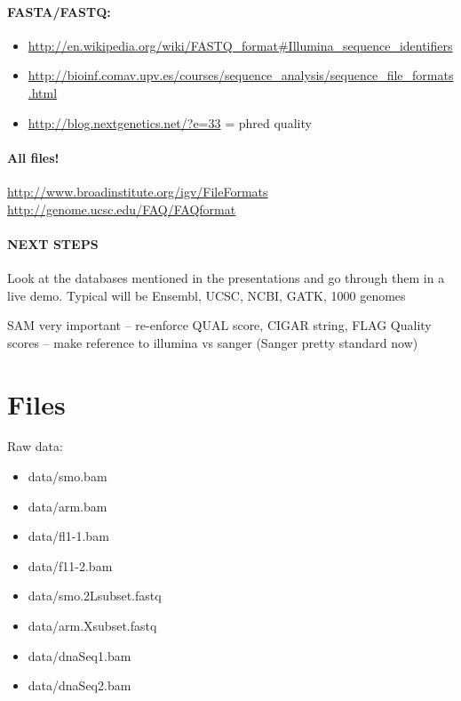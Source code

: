 \documentclass[letterpaper,10pt,english]{sphinxmanual}
\begin{document}
\subsubsection{FASTA/FASTQ:}
\label{known_file_formats:fasta-fastq}\begin{itemize}
\item {} 
\href{http://en.wikipedia.org/wiki/FASTQ\_format\#Illumina\_sequence\_identifiers}{http://en.wikipedia.org/wiki/FASTQ\_format\#Illumina\_sequence\_identifiers}

\item {} 
\href{http://bioinf.comav.upv.es/courses/sequence\_analysis/sequence\_file\_formats.html}{http://bioinf.comav.upv.es/courses/sequence\_analysis/sequence\_file\_formats.html}

\item {} 
\href{http://blog.nextgenetics.net/?e=33}{http://blog.nextgenetics.net/?e=33}  = phred quality

\end{itemize}


\subsubsection{All files!}
\label{known_file_formats:all-files}
\href{http://www.broadinstitute.org/igv/FileFormats}{http://www.broadinstitute.org/igv/FileFormats}
\href{http://genome.ucsc.edu/FAQ/FAQformat}{http://genome.ucsc.edu/FAQ/FAQformat}


\subsubsection{NEXT STEPS}
\label{known_file_formats:next-steps}
Look at the databases mentioned in the presentations and go through them in a live demo. Typical
will be Ensembl, UCSC, NCBI, GATK, 1000 genomes

SAM very important – re-enforce QUAL score, CIGAR string, FLAG
Quality scores – make reference to illumina vs sanger (Sanger pretty standard now)


\chapter{Files}
\label{file:files}\label{file::doc}
Raw data:
\begin{itemize}
\item {} 
data/smo.bam

\item {} 
data/arm.bam

\item {} 
data/fl1-1.bam

\item {} 
data/f11-2.bam

\item {} 
data/smo.2Lsubset.fastq

\item {} 
data/arm.Xsubset.fastq

\item {} 
data/dnaSeq1.bam

\item {} 
data/dnaSeq2.bam

\end{itemize}
\end{document}
